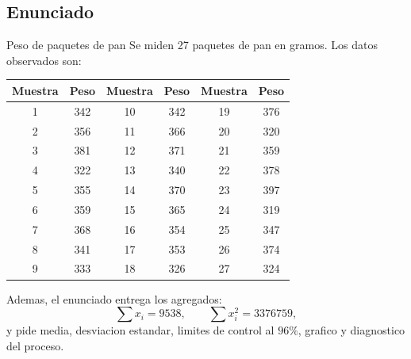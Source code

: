 \subsection{Enunciado}

\begin{enunciado}{Peso de paquetes de pan}
Se miden 27 paquetes de pan en gramos. Los datos observados son:

\begin{center}
\begin{tabular}{cc|cc|cc}
\toprule
Muestra & Peso & Muestra & Peso & Muestra & Peso \\
\midrule
1 & 342 & 10 & 342 & 19 & 376 \\
2 & 356 & 11 & 366 & 20 & 320 \\
3 & 381 & 12 & 371 & 21 & 359 \\
4 & 322 & 13 & 340 & 22 & 378 \\
5 & 355 & 14 & 370 & 23 & 397 \\
6 & 359 & 15 & 365 & 24 & 319 \\
7 & 368 & 16 & 354 & 25 & 347 \\
8 & 341 & 17 & 353 & 26 & 374 \\
9 & 333 & 18 & 326 & 27 & 324 \\
\bottomrule
\end{tabular}
\end{center}

Ademas, el enunciado entrega los agregados:
\[
\sum x_i=9538,\qquad \sum x_i^2=3376759,
\]
y pide media, desviacion estandar, limites de control al \(96\%\), grafico y diagnostico del proceso.
\end{enunciado}
